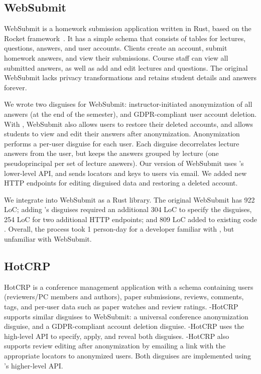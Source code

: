 \subsection{WebSubmit}
\label{s:case-websubmit}

%
WebSubmit is a homework submission application written in Rust, based on the Rocket
framework~\cite{rocket-rs}.
%
It has a simple schema that consists of tables for lectures, questions, answers,
and user accounts.
%
Clients create an account, submit homework answers, and view their submissions.
%
Course staff can view all submitted answers, as well as add and edit lectures and
questions.
%
The original WebSubmit lacks privacy transformations and retains student
details and answers forever.
%

%
We wrote two disguises for WebSubmit: instructor-initiated anonymization of all answers
(\eg at the end of the semester), and GDPR-compliant user account deletion.
%
With \sys, WebSubmit also allows users to restore their deleted accounts, and allows
students to view and edit their answers after anonymization.
%
Anonymization performs a per-user disguise for each user.
%
Each disguise decorrelates lecture answers from the user, but keeps the answers grouped
by lecture (\ie one pseudoprincipal per set of lecture answers).
%
Our version of WebSubmit uses \sys's lower-level API, and sends locators and keys to users
via email.
%
We added new HTTP endpoints for editing disguised data and restoring a deleted account.
%

%
We integrate \sys into WebSubmit as a Rust library.
%
The original WebSubmit has 922 LoC; adding \sys's disguises required an additional 304 LoC
to specify the disguises, 254 LoC for two additional HTTP endpoints; and 809 LoC added to
existing code  .
%
Overall, the process took 1 person-day for a developer familiar with \sys, but
unfamiliar with WebSubmit.
%

\subsection{HotCRP}
HotCRP is a conference management application with a schema containing users (reviewers/PC members and
authors), paper submissions, reviews, comments, tags, and per-user data such as paper watches and review ratings.
%
\sys-HotCRP supports similar disguises to WebSubmit: a universal conference anonymization disguise,
and a GDPR-compliant account deletion disguise.  \sys-HotCRP uses the high-level \sys API to
specify, apply, and reveal both disguises.  \sys-HotCRP also supports review editing after
anonymization by emailing a link with the appropriate locators to anonymized users. Both disguises
are implemented using \sys's higher-level API.

